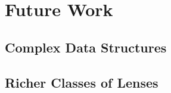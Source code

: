 \section{Future Work}
\label{sec:future}
\subsection{Complex Data Structures}
\subsection{Richer Classes of Lenses}



